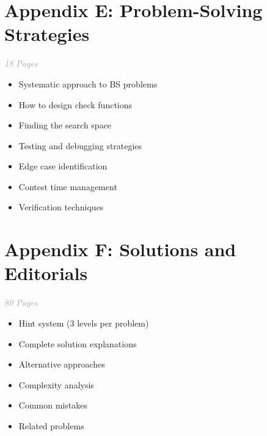 \documentclass[11pt,a4paper,oneside]{book}
\begin{document}
\section*{Appendix E: Problem-Solving Strategies}

\begin{tcolorbox}[
    enhanced,
    colback=white,
    colframe=primaryblue,
    boxrule=1.5pt,
    arc=3mm
]
\textit{\textcolor{darkgray}{18 Pages}}
\end{tcolorbox}

\vspace{0.3cm}

\begin{itemize}[leftmargin=*, itemsep=5pt]
    \item[\textcolor{successgreen}{$\bullet$}] Systematic approach to BS problems
    \item[\textcolor{successgreen}{$\bullet$}] How to design check functions
    \item[\textcolor{successgreen}{$\bullet$}] Finding the search space
    \item[\textcolor{successgreen}{$\bullet$}] Testing and debugging strategies
    \item[\textcolor{successgreen}{$\bullet$}] Edge case identification
    \item[\textcolor{successgreen}{$\bullet$}] Contest time management
    \item[\textcolor{successgreen}{$\bullet$}] Verification techniques
\end{itemize}

\section*{Appendix F: Solutions and Editorials}

\begin{tcolorbox}[
    enhanced,
    colback=white,
    colframe=primaryblue,
    boxrule=1.5pt,
    arc=3mm
]
\textit{\textcolor{darkgray}{80 Pages}}
\end{tcolorbox}

\vspace{0.3cm}

\begin{itemize}[leftmargin=*, itemsep=5pt]
    \item[\textcolor{successgreen}{$\bullet$}] Hint system (3 levels per problem)
    \item[\textcolor{successgreen}{$\bullet$}] Complete solution explanations
    \item[\textcolor{successgreen}{$\bullet$}] Alternative approaches
    \item[\textcolor{successgreen}{$\bullet$}] Complexity analysis
    \item[\textcolor{successgreen}{$\bullet$}] Common mistakes
    \item[\textcolor{successgreen}{$\bullet$}] Related problems
\end{itemize}
\end{document}

